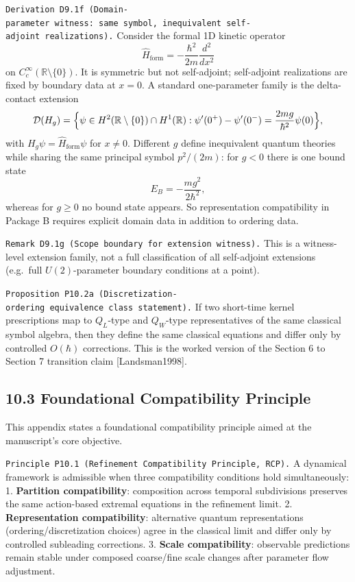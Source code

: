 \documentclass[
]{article}
\begin{document}
\texttt{Derivation\ D9.1f\ (Domain-parameter\ witness:\ same\ symbol,\ inequivalent\ self-adjoint\ realizations).}
Consider the formal 1D kinetic operator \[
\widehat H_{\mathrm{form}}=-\frac{\hbar^2}{2m}\frac{d^2}{dx^2}
\] on \(C_c^\infty(\mathbb R\setminus\{0\})\). It is symmetric but not
self-adjoint; self-adjoint realizations are fixed by boundary data at
\(x=0\). A standard one-parameter family is the delta-contact extension
\[
\mathcal D(H_g)=\Bigl\{\psi\in H^2(\mathbb R\setminus\{0\})\cap H^1(\mathbb R):
\psi'(0^+)-\psi'(0^-)=\frac{2mg}{\hbar^2}\psi(0)\Bigr\},
\] with \(H_g\psi=\widehat H_{\mathrm{form}}\psi\) for \(x\neq0\).
Different \(g\) define inequivalent quantum theories while sharing the
same principal symbol \(p^2/(2m)\): for \(g<0\) there is one bound state
\[
E_B=-\frac{m g^2}{2\hbar^2},
\] whereas for \(g\ge0\) no bound state appears. So representation
compatibility in Package B requires explicit domain data in addition to
ordering data.

\texttt{Remark\ D9.1g\ (Scope\ boundary\ for\ extension\ witness).} This
is a witness-level extension family, not a full classification of all
self-adjoint extensions (e.g.~full \(U(2)\)-parameter boundary
conditions at a point).

\texttt{Proposition\ P10.2a\ (Discretization-ordering\ equivalence\ class\ statement).}
If two short-time kernel prescriptions map to \(Q_L\)-type and
\(Q_W\)-type representatives of the same classical symbol algebra, then
they define the same classical equations and differ only by controlled
\(O(\hbar)\) corrections. This is the worked version of the Section 6 to
Section 7 transition claim {[}Landsman1998{]}.

\subsection{10.3 Foundational Compatibility
Principle}\label{foundational-compatibility-principle}

This appendix states a foundational compatibility principle aimed at the
manuscript's core objective.

\texttt{Principle\ P10.1\ (Refinement\ Compatibility\ Principle,\ RCP).}
A dynamical framework is admissible when three compatibility conditions
hold simultaneously: 1. \textbf{Partition compatibility}: composition
across temporal subdivisions preserves the same action-based extremal
equations in the refinement limit. 2. \textbf{Representation
compatibility}: alternative quantum representations
(ordering/discretization choices) agree in the classical limit and
differ only by controlled subleading corrections. 3. \textbf{Scale
compatibility}: observable predictions remain stable under composed
coarse/fine scale changes after parameter flow adjustment.
\end{document}
